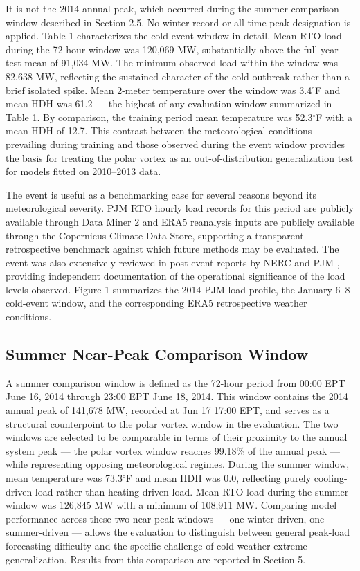\documentclass[12pt,a4paper]{article}
\begin{document}
 It is not the 2014 annual peak, which occurred during the summer comparison window described in Section 2.5. No winter record or all-time peak designation is applied.
Table 1 characterizes the cold-event window in detail. Mean RTO load during the 72-hour window was 120,069 MW, substantially above the full-year test mean of 91,034 MW. The minimum observed load within the window was 82,638 MW, reflecting the sustained character of the cold outbreak rather than a brief isolated spike. Mean 2-meter temperature over the window was 3.4$^\circ$F and mean HDH was 61.2 --- the highest of any evaluation window summarized in Table 1. By comparison, the training period mean temperature was 52.3$^\circ$F with a mean HDH of 12.7. This contrast between the meteorological conditions prevailing during training and those observed during the event window provides the basis for treating the polar vortex as an out-of-distribution generalization test for models fitted on 2010–2013 data.


The event is useful as a benchmarking case for several reasons beyond its meteorological severity. PJM RTO hourly load records for this period are publicly available through Data Miner 2 and ERA5 reanalysis inputs are publicly available through the Copernicus Climate Data Store, supporting a transparent retrospective benchmark against which future methods may be evaluated. The event was also extensively reviewed in post-event reports by NERC and PJM \cite{nerc2014polar,pjm2014polar}, providing independent documentation of the operational significance of the load levels observed.
Figure 1 summarizes the 2014 PJM load profile, the January 6–8 cold-event window, and the corresponding ERA5 retrospective weather conditions.
\subsection{Summer Near-Peak Comparison Window}
A summer comparison window is defined as the 72-hour period from 00:00 EPT June 16, 2014 through 23:00 EPT June 18, 2014. This window contains the 2014 annual peak of 141,678 MW, recorded at Jun 17 17:00 EPT, and serves as a structural counterpoint to the polar vortex window in the evaluation.
The two windows are selected to be comparable in terms of their proximity to the annual system peak --- the polar vortex window reaches 99.18\% of the annual peak --- while representing opposing meteorological regimes. During the summer window, mean temperature was 73.3$^\circ$F and mean HDH was 0.0, reflecting purely cooling-driven load rather than heating-driven load. Mean RTO load during the summer window was 126,845 MW with a minimum of 108,911 MW. Comparing model performance across these two near-peak windows --- one winter-driven, one summer-driven --- allows the evaluation to distinguish between general peak-load forecasting difficulty and the specific challenge of cold-weather extreme generalization. Results from this comparison are reported in Section 5.
\end{document}
